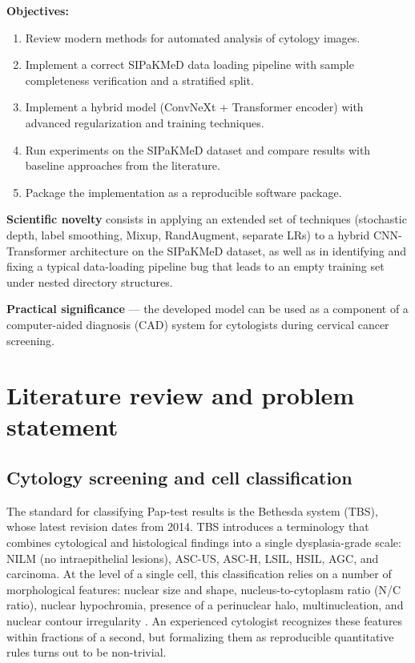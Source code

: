 \documentclass[14pt,a4paper]{extreport}
\begin{document}
\textbf{Objectives:}
\begin{enumerate}
    \item Review modern methods for automated analysis of cytology
          images.
    \item Implement a correct SIPaKMeD data loading pipeline with
          sample completeness verification and a stratified split.
    \item Implement a hybrid model (ConvNeXt + Transformer encoder) with
          advanced regularization and training techniques.
    \item Run experiments on the SIPaKMeD dataset and compare results
          with baseline approaches from the literature.
    \item Package the implementation as a reproducible software package.
\end{enumerate}

\textbf{Scientific novelty} consists in applying an extended set of
techniques (stochastic depth, label smoothing, Mixup, RandAugment,
separate LRs) to a hybrid CNN-Transformer architecture on the SIPaKMeD
dataset, as well as in identifying and fixing a typical data-loading
pipeline bug that leads to an empty training set under nested directory
structures.

\textbf{Practical significance} --- the developed model can be used as a
component of a computer-aided diagnosis (CAD) system for cytologists
during cervical cancer screening.

\chapter{Literature review and problem statement}
\label{ch:literature}

\section{Cytology screening and cell classification}

The standard for classifying Pap-test results is the Bethesda system
(TBS), whose latest revision dates from 2014. TBS introduces a
terminology that combines cytological and histological findings into a
single dysplasia-grade scale: NILM (no intraepithelial lesions), ASC-US,
ASC-H, LSIL, HSIL, AGC, and carcinoma. At the level of a single cell,
this classification relies on a number of morphological features:
nuclear size and shape, nucleus-to-cytoplasm ratio (N/C ratio), nuclear
hypochromia, presence of a perinuclear halo, multinucleation, and
nuclear contour irregularity \cite{randel2013acog}. An experienced
cytologist recognizes these features within fractions of a second, but
formalizing them as reproducible quantitative rules turns out to be
non-trivial.
\end{document}
